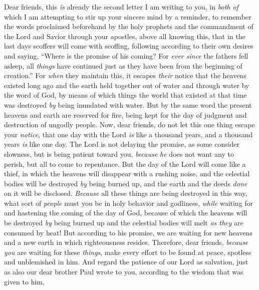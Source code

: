 \begin{biblechapter} %
 Dear friends, this \textit{is} already the second letter I am writing to you, in \textit{both of} which I am attempting to stir up your sincere mind by a reminder,
\verse to remember the words proclaimed beforehand by the holy prophets and the commandment of the Lord and Savior through your apostles,
\verse above all knowing this, that in the last days scoffers will come with scoffing, following according to their own desires
\verse and saying, “Where is the promise of his coming? For \textit{ever since} the fathers fell asleep, all \textit{things} have continued just as they have been from the beginning of creation.”
\verse For \textit{when} they maintain this, it escapes \textit{their} notice that the heavens existed long ago and the earth held together out of water and through water by the word of God,
\verse by means of which things the world that existed at that time was destroyed \textit{by} being inundated with water.
\verse But by the same word the present heavens and earth are reserved for fire, being kept for the day of judgment and destruction of ungodly people.
\verse Now, dear friends, do not let this one thing escape your \textit{notice}, that one day with the Lord \textit{is} like a thousand years, and a thousand years \textit{is} like one day.
\verse The Lord is not delaying the promise, as some consider slowness, but is being patient toward you, \textit{because he} does not want any to perish, but all to come to repentance.
\verse But the day of the Lord will come like a thief, in which the heavens will disappear with a rushing noise, and the celestial bodies will be destroyed \textit{by} being burned up, and the earth and the deeds \textit{done} on it will be disclosed.
\verse \textit{Because} all these things are being destroyed in this way, what sort of \textit{people} must you be in holy behavior and godliness,
\verse \textit{while} waiting for and hastening the coming of the day of God, because of which the heavens will be destroyed \textit{by} being burned up and the celestial bodies will melt \textit{as they} are consumed by heat!
\verse But according to his promise, we are waiting for new heavens and a new earth in which righteousness resides.
 Therefore, dear friends, \textit{because you} are waiting for these \textit{things}, make every effort to be found at peace, spotless and unblemished in him.
\verse And regard the patience of our Lord as salvation, just as also our dear brother Paul wrote to you, according to the wisdom that was given to him,

\end{biblechapter}
